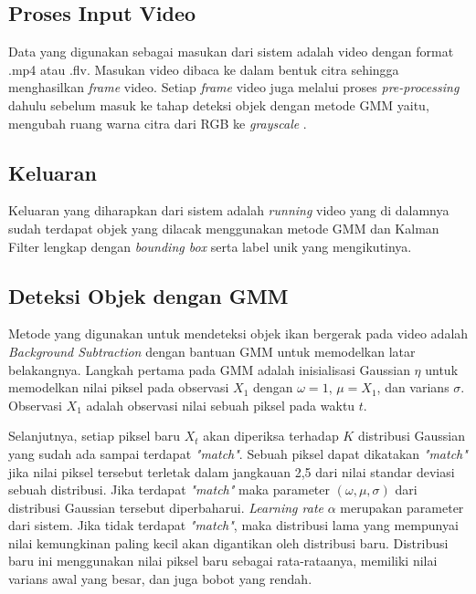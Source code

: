     \subsection{Proses Input Video}
        Data yang digunakan sebagai masukan dari sistem adalah video dengan format .mp4 atau .flv. Masukan video dibaca ke dalam bentuk citra sehingga menghasilkan \textit{frame} video. Setiap \textit{frame} video juga melalui proses \textit{pre-processing} dahulu sebelum masuk ke tahap deteksi objek dengan metode GMM yaitu, mengubah ruang warna citra dari RGB ke \textit{grayscale} .
        
    \subsection{Keluaran}
        Keluaran yang diharapkan dari sistem  adalah \textit{running} video yang di dalamnya sudah terdapat objek yang dilacak menggunakan metode GMM dan Kalman Filter lengkap dengan \textit{bounding box} serta label unik yang mengikutinya.
        
    \subsection{Deteksi Objek dengan GMM}
        Metode yang digunakan untuk mendeteksi objek ikan bergerak pada video adalah \textit{Background Subtraction} dengan bantuan GMM untuk memodelkan latar belakangnya. Langkah pertama pada GMM adalah inisialisasi Gaussian $\eta$ untuk memodelkan nilai piksel pada observasi $X_1$ dengan $\omega = 1$, $\mu = X_1$, dan varians $\sigma$. Observasi $X_1$ adalah observasi nilai sebuah piksel pada waktu $t$.
        
        Selanjutnya, setiap piksel baru $X_t$ akan diperiksa terhadap $K$ distribusi Gaussian yang sudah ada sampai terdapat \textit{"match"}. Sebuah piksel dapat dikatakan \textit{"match"} jika nilai piksel tersebut terletak dalam jangkauan 2,5 dari nilai standar deviasi sebuah distribusi. Jika terdapat \textit{"match"} maka parameter $(\omega, \mu, \sigma)$ dari distribusi Gaussian tersebut diperbaharui. \textit{Learning rate} $\alpha$ merupakan parameter dari sistem. Jika tidak terdapat \textit{"match"}, maka distribusi lama yang mempunyai nilai kemungkinan paling kecil akan digantikan oleh distribusi baru. Distribusi  baru  ini  menggunakan  nilai  piksel  baru  sebagai  rata-rataanya, memiliki nilai varians awal yang besar, dan juga bobot yang rendah.\\
        
